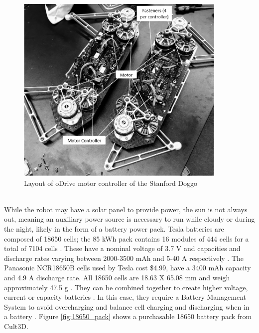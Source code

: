 \begin{figure}[H]
    \centering
    \includegraphics[width=0.9\textwidth]{Sections/LiteratureReview/img/doggo/doggo_motor_controllers.jpeg}
    \caption{Layout of oDrive motor controller of the Stanford Doggo
    \cite{kau_nate711/stanforddoggoproject_2019}}
    \label{fig:doggo_odrive}
\end{figure}

\mbox{}\\

While the robot may have a solar panel to provide power, the sun is not always out, meaning an auxiliary power source is necessary to run while cloudy or during the night, likely in the form of a battery power pack.
Tesla batteries are composed of 18650 cells; the 85 kWh pack contains 16 modules of 444 cells for a total of 7104 cells \cite{lambert_tear_2016}.
These have a nominal voltage of 3.7 V and capacities and discharge rates varying between 2000-3500 mAh and 5-40 A respectively \cite{18650batterystore_18650_nodate}.
The Panasonic NCR18650B cells used by Tesla cost \$4.99, have a 3400 mAh capacity and 4.9 A discharge rate.
All 18650 cells are 18.63 X 65.08 mm and weigh approximately 47.5 g \cite{18650batterystore_18650_nodate}.
They can be combined together to create higher voltage, current or capacity batteries \cite{fcbrand_building_2017}.
In this case, they require a Battery Management System to avoid overcharging and balance cell charging and discharging when in a battery \cite{engineering.com_battery_nodate} \cite{spinningmagnets_home-built_2015}.
Figure \ref{fig:18650_pack} shows a purchasable 18650 battery pack from Cult3D.

